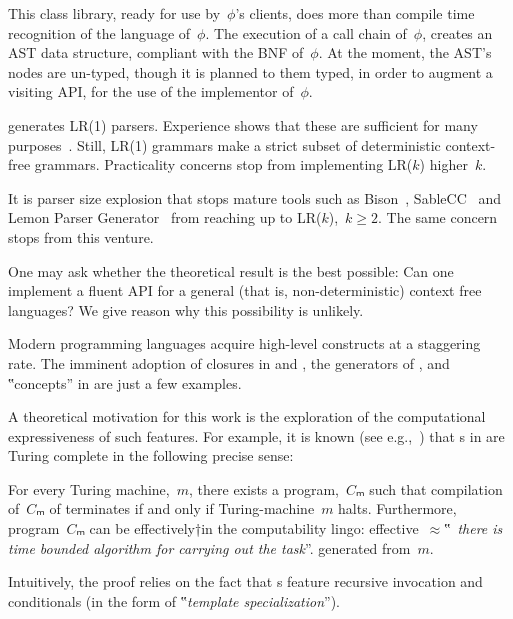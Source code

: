 This class library, ready for use by~$ϕ$'s clients, does more
  than compile time recognition
  of the language of~$ϕ$.
The execution of a call chain of~$ϕ$, creates an AST data structure,
  compliant with the BNF of~$ϕ$.
At the moment, the AST's nodes are un-typed, though it is planned
  to them typed, in order to augment a visiting API, for the use of the
  implementor of~$ϕ$.

\Self generates LR(1) parsers. Experience shows that these are
  sufficient for many purposes~\cite{find some references, perhaps the bison manual, but I am sure there are better references}.
Still, LR(1) grammars make a strict subset of deterministic context-free grammars.
Practicality concerns stop \Self from implementing LR($k$) higher~$k$. 

It is parser size explosion that stops mature tools such as Bison~\cite{Bison},
  SableCC~\cite{Sable:Search in databased, it should be there} and Lemon Parser Generator~\cite{something}
  from reaching up to LR($k$),~$k≥2$.
The same concern stops \Self from this venture.

One may ask whether the theoretical result is the
  best possible:
Can one implement a fluent API for a general
  (that is, non-deterministic) context free languages?
We give reason why this possibility is unlikely. 

Modern programming languages acquire high-level constructs
  at a staggering rate.
The imminent adoption of closures in \Java and \CC,
  the generators of \CSharp, and ‟concepts” in
  \CC are just a few examples.

A theoretical motivation for this work
  is the exploration of the computational
  expressiveness of such features.
For example, it is known (see e.g.,~\cite{Gutterman:2003}) that
  s in \CC are Turing complete in the following precise sense:

\begin{Theorem}
  \label{Theorem:Gutterman}
  For every Turing machine,~$m$, there exists a \CC program,~$Cₘ$ such that
    compilation of~$Cₘ$ of terminates if and only if
      Turing-machine~$m$ halts.
  Furthermore, program~$Cₘ$ can be effectively†{in the computability lingo:
    effective~$≈$‟~\emph{there is time
  bounded algorithm for carrying out the task}”.} generated from~$m$.
\end{Theorem}

Intuitively, the proof relies on the fact that s
  feature recursive invocation and conditionals (in the form of
  ‟\emph{template specialization}”).

